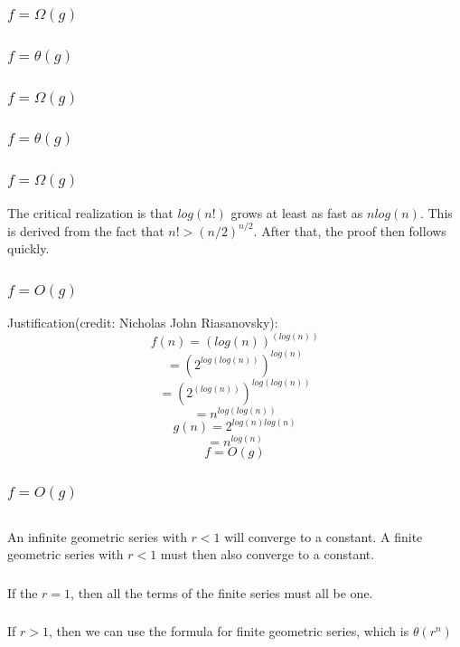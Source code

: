 \documentclass{article}
\begin{document}
\subsubsection{$f = \Omega(g)$}
\subsubsection{$f = \theta(g)$}
\subsubsection{$f = \Omega(g)$}
\subsubsection{$f = \theta(g)$}
\subsubsection{$f = \Omega(g)$}
The critical realization is that $log(n!)$ grows at least as fast as $nlog(n)$. This is derived from the fact that $n! > (n/2)^{n/2}$. After that, the proof then follows quickly. 
\subsubsection{$f = O(g)$}
Justification(credit: Nicholas John Riasanovsky): 
$$f(n)=(log(n))^{(log(n))}$$
$$=(2^{log(log(n))})^{log(n)}$$
$$=(2^{(log(n))})^{log(log(n))}$$
$$=n^{log(log(n))}$$
$$g(n)=2^{log(n)log(n)}$$
$$=n^{log(n)}$$
$$f=O(g)$$
\subsubsection{$f = O(g)$}
\subsection{}
\subsubsection{}An infinite geometric series with $r < 1$ will converge to a constant. A finite geometric series with $r < 1$ must then also converge to a constant. 
\subsubsection{}If the $r=1$, then all the terms of the finite series must all be one. 
\subsubsection{}If $r > 1$, then we can use the formula for finite geometric series, which is $\theta(r^n)$
\end{document}
